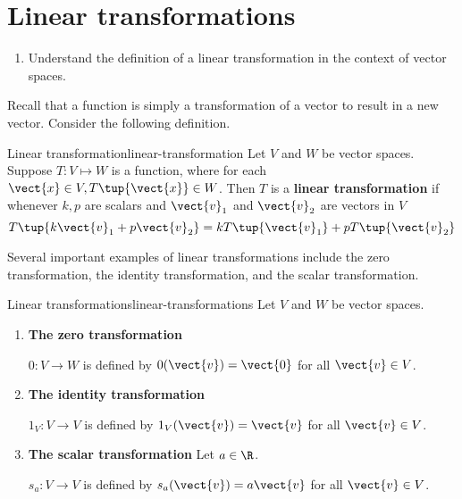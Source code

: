 \section{Linear transformations}

\begin{outcome}
  \begin{enumerate}
  \item Understand the definition of a linear transformation in the
    context of vector spaces.
  \end{enumerate}
\end{outcome}

Recall that a function is simply a transformation of a vector to result in a new vector. Consider the following definition. 

\begin{definition}{Linear transformation}{linear-transformation}
 Let $V$ and $W$ be vector spaces. Suppose $T: V \mapsto W$ is a function, where for each
$\vect{x} \in V ,T\tup{\vect{x}}\in W$. Then $T$ is a
\textbf{linear transformation} if whenever $k ,p $ are scalars and 
$\vect{v}_1$ and $\vect{v}_2$ are vectors in $V$
\begin{equation*}
T\tup{k \vect{v}_1 + p \vect{v}_2 } = kT\tup{\vect{v}_1}+ pT\tup{\vect{v}_{2} }
\end{equation*}
\end{definition}

Several important examples of linear transformations include the zero transformation, the identity transformation, and the scalar transformation. 

\begin{example}{Linear transformations}{linear-transformations}
Let $V$ and $W$ be vector spaces.

\begin{enumerate}
\item \textbf{The zero transformation}

$0:V\to W$ is defined by $0(\vect{v})=\vect{0}$ for all $\vect{v}\in V$.


\item \textbf{The identity transformation}

$1_V:V\to V$ is defined by $1_V(\vect{v})=\vect{v}$ for all $\vect{v}\in V$.

\item \textbf{The scalar transformation}
Let $a\in\R$.

$s_a:V\to V$ is defined by $s_a(\vect{v})=a\vect{v}$ for all $\vect{v}\in V$.
\end{enumerate}
\end{example}

